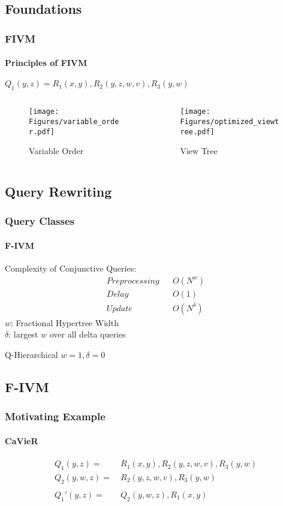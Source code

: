 \documentclass[
	11pt, %
]{beamer}
\begin{document}

\subsection{Foundations}
\begin{frame}
		\frametitle{FIVM}
		\framesubtitle{Principles of FIVM}


		$Q_1(y,z) = R_1(x, y), R_2(y,z,w,v), R_3(y,w)$
		\begin{columns}[c] 
			\begin{column}{0.45\textwidth} 
				\begin{figure}
					\texttt{[image: Figures/variable\_order.pdf]}
					\caption{Variable Order}
				\end{figure}
			\end{column}
			\begin{column}{0.45\textwidth} 
				\begin{figure}
					\texttt{[image: Figures/optimized\_viewtree.pdf]}
					\caption{View Tree}
				\end{figure}
			\end{column}
		\end{columns}

\end{frame}
\subsection{Query Rewriting}
\begin{frame}
	\frametitle{Query Classes}
	\framesubtitle{F-IVM}
	Complexity of Conjunctive Queries:
	\begin{align*}
		Preprocessing & & O(N^w) \\
		Delay & & O(1) \\
		Update & & O(N^\delta)
	\end{align*}
	$w$: Fractional Hypertree Width\\
	$\delta$: largest $w$ over all delta queries
	\begin{block}{Q-Hierarchical}
		$w = 1, \delta=0$ 
	\end{block}
\end{frame}
\subsection{F-IVM}
\begin{frame}
	\frametitle{Motivating Example}
	\framesubtitle{CaVieR}
	\begin{align*}
		Q_1(y,z) =&\ R_1(x, y), R_2(y,z,w,v), R_3(y,w)\\
		Q_2(y,w,z) =&\ R_2(y,z,w,v), R_3(y,w)\\\\
		Q_1'(y,z) =&\ Q_2(y,w,z), R_1(x, y)
	\end{align*}
\end{frame}
\end{document}
